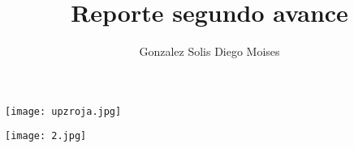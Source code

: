 \documentclass[12pt,a4paper]{article}
\author{Gonzalez Solis Diego Moises}
\title{Reporte segundo avance}
\begin{document}
\maketitle
\texttt{[image: upzroja.jpg]} 
\newpage

\texttt{[image: 2.jpg]} 
\end{document}
